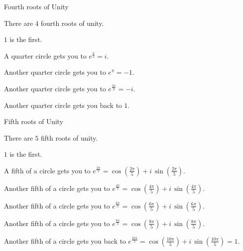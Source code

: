 \documentclass{ximera}
\begin{document}
\begin{example}  Fourth roots of Unity

There are $4$ fourth roots of unity.

$1$ is the first.

A quarter circle gets you to $e^{\tfrac{\pi}{2}} = i$. 

Another quarter circle gets you to $e^{\pi} = -1$. 

Another quarter circle gets you to $e^{\tfrac{3\pi}{2}} = -i$. 

Another quarter circle gets you back to $1$.


\end{example}











\begin{example}  Fifth roots of Unity

There are $5$ fifth roots of unity.

$1$ is the first.



A fifth of a circle gets you to $e^{\tfrac{2\pi}{5}} = \cos(\tfrac{2\pi}{5}) + i \, \sin(\tfrac{2\pi}{5})$. 

Another fifth of a circle gets you to $e^{\tfrac{4\pi}{5}} = \cos(\tfrac{4\pi}{5}) + i \, \sin(\tfrac{4\pi}{5})$.

Another fifth of a circle gets you to $e^{\tfrac{6\pi}{5}} = \cos(\tfrac{6\pi}{5}) + i \, \sin(\tfrac{6\pi}{5})$.

Another fifth of a circle gets you to $e^{\tfrac{8\pi}{5}} = \cos(\tfrac{8\pi}{5}) + i \, \sin(\tfrac{8\pi}{5})$.

Another fifth of a circle gets you back to $e^{\tfrac{10\pi}{5}} = \cos(\tfrac{10\pi}{5}) + i \, \sin(\tfrac{10\pi}{5}) = 1$.


\end{example}
\end{document}
